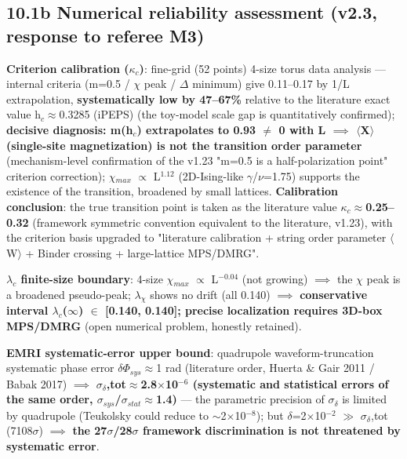 \documentclass[12pt]{article}
\newcommand{\up}[1]{\ensuremath{^{#1}}}
\newcommand{\down}[1]{\ensuremath{_{#1}}}
\begin{document}
\subsection{10.1b Numerical reliability assessment (v2.3, response to referee M3)}

\textbf{Criterion calibration (\ensuremath{\kappa}\down{c})}: fine-grid (52 points) 4-size torus data analysis --- internal criteria (m=0.5 / \ensuremath{\chi} peak / \ensuremath{\Delta} minimum) give 0.11--0.17 by 1/L extrapolation, \textbf{systematically low by 47--67\%} relative to the literature exact value h\down{c}\ensuremath{\approx}0.3285 (iPEPS) (the toy-model scale gap is quantitatively confirmed); \textbf{decisive diagnosis: m(h\down{c}) extrapolates to 0.93 \ensuremath{\neq} 0 with L \ensuremath{\implies} \ensuremath{\langle}X\ensuremath{\rangle} (single-site magnetization) is not the transition order parameter} (mechanism-level confirmation of the v1.23 "m=0.5 is a half-polarization point" criterion correction); \ensuremath{\chi}\down{max} \ensuremath{\propto} L\up{1.12} (2D-Ising-like \ensuremath{\gamma}/\ensuremath{\nu}=1.75) supports the existence of the transition, broadened by small lattices. \textbf{Calibration conclusion}: the true transition point is taken as the literature value \textbf{\ensuremath{\kappa}\down{c}\ensuremath{\approx}0.25--0.32} (framework symmetric convention equivalent to the literature, v1.23), with the criterion basis upgraded to "literature calibration + string order parameter \ensuremath{\langle}W\ensuremath{\rangle} + Binder crossing + large-lattice MPS/DMRG".

\textbf{\ensuremath{\lambda}\down{c} finite-size boundary}: 4-size \ensuremath{\chi}\down{max} \ensuremath{\propto} L\up{-0.04} (not growing) \ensuremath{\implies} the \ensuremath{\chi} peak is a broadened pseudo-peak; \ensuremath{\lambda}\down{\chi{}} shows no drift (all 0.140) \ensuremath{\implies} \textbf{conservative interval \ensuremath{\lambda}\down{c}(\ensuremath{\infty}) \ensuremath{\in} [0.140, 0.140]; precise localization requires 3D-box MPS/DMRG} (open numerical problem, honestly retained).

\textbf{EMRI systematic-error upper bound}: quadrupole waveform-truncation systematic phase error \ensuremath{\delta}\ensuremath{\Phi}\down{sys}\ensuremath{\approx}1 rad (literature order, Huerta \& Gair 2011 / Babak 2017) \ensuremath{\implies} \textbf{\ensuremath{\sigma}\down{\delta{}},tot\ensuremath{\approx}2.8\ensuremath{\times}10\up{-6} (systematic and statistical errors of the same order, \ensuremath{\sigma}\down{sys}/\ensuremath{\sigma}\down{stat}\ensuremath{\approx}1.4)} --- the parametric precision of \ensuremath{\sigma}\down{\delta{}} is limited by quadrupole (Teukolsky could reduce to \ensuremath{\sim}2\ensuremath{\times}10\up{-8}); but \ensuremath{\delta}=2\ensuremath{\times}10\up{-2} \ensuremath{\gg} \ensuremath{\sigma}\down{\delta{}},tot (7108\ensuremath{\sigma}) \ensuremath{\implies} \textbf{the 27\ensuremath{\sigma}/28\ensuremath{\sigma} framework discrimination is not threatened by systematic error}.
\end{document}
